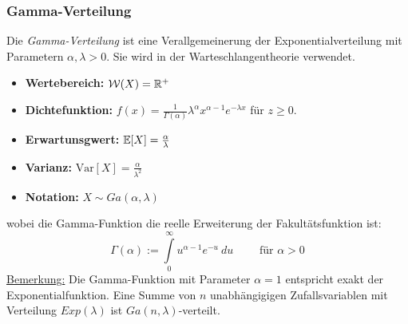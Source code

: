 \subsubsection{Gamma-Verteilung}
Die \textit{Gamma-Verteilung} ist eine Verallgemeinerung der Exponentialverteilung mit Parametern $\alpha, \lambda > 0$. Sie wird in der Warteschlangentheorie verwendet.
\begin{itemize}
\item \textbf{Wertebereich:} $\mathcal{W}(X) = \mathbb{R}^+$
\item \textbf{Dichtefunktion:} $f(x) = \frac{1}{\Gamma(\alpha)}\lambda^\alpha x^{\alpha -1} e^{-\lambda x}$ für $z \geq 0$.
\item \textbf{Erwartunsgwert:} $\mathbb{E}[X] = \frac{\alpha}{\lambda}$
\item \textbf{Varianz:} $\mathrm{Var}[X] = \frac{\alpha}{\lambda^2}$
\item \textbf{Notation:} $X \sim Ga(\alpha, \lambda)$
\end{itemize}
wobei die Gamma-Funktion die reelle Erweiterung der Fakultätsfunktion ist:
$$ \Gamma(\alpha) := \int \limits_0^\infty u^{\alpha -1}e^{-u} \ du \quad \quad \mbox{ für } \alpha > 0$$ \underline{Bemerkung:} Die Gamma-Funktion mit Parameter $\alpha =1$ entspricht exakt der Exponentialfunktion. Eine Summe von $n$ unabhängigigen Zufallsvariablen mit Verteilung $Exp(\lambda)$ ist $Ga(n, \lambda)$-verteilt.

